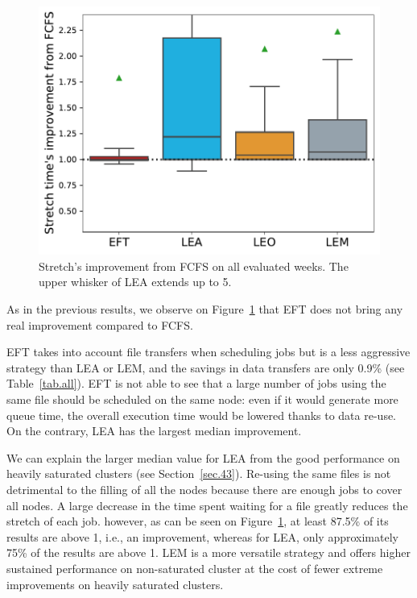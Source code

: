\documentclass[conference]{IEEEtran}
\newcommand{\rev}[1]{{\color{black}{#1}}}
\begin{document}
\begin{figure}[t]\centering\includegraphics[width=0.9\linewidth]{../MBSS/plot/Boxplot/byuser/box_plot_stretch_all-all_1.pdf}\caption{Stretch's improvement from FCFS on all evaluated weeks. The upper whisker of LEA extends up to 5.}\label{boxplot.all}\end{figure}
As in the previous results, we observe on Figure~\ref{boxplot.all} that EFT does not bring any real improvement compared to FCFS.

EFT takes into account file transfers when scheduling jobs but is a less aggressive strategy than LEA or LEM, and the savings in data transfers are only 0.9\% (see Table~\ref{tab.all}).
EFT is not able to see that a large number of jobs using the same file
should be scheduled on the same node: even if it would generate more
queue time, the overall execution time would be lowered thanks to data re-use.
On the contrary, LEA has the largest median improvement.

We can explain the larger median value for LEA from the good performance on heavily saturated clusters (see Section~\ref{sec.43}).
Re-using the same files is not detrimental to the filling of all the nodes because there are enough jobs to cover all nodes.
A large decrease \rev{(see Table~\ref{tab.all})} in the time spent waiting for a file greatly reduces the stretch of each job.
\rev{LEM has a lower median,}
however, as can be seen on Figure~\ref{boxplot.all}, at least 87.5\% of its results are above 1, i.e., an improvement, whereas for LEA, only approximately 75\% of the results are above 1. 
LEM is a more versatile strategy and offers higher sustained performance on non-saturated cluster at the cost
of fewer extreme improvements on heavily saturated clusters.
\end{document}
